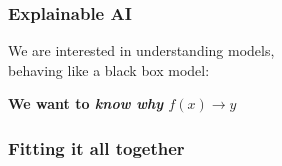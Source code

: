 \begin{frame}[t]
    \frametitle{Explainable AI}
    We are interested in understanding models,\\
    behaving like a black box model:\\\vspace{20pt}
    \pause
    \vspace{20pt}
    \begin{center}
        \textbf{We want to \emph{know why} $f(x)\rightarrow y$}
    \end{center}
    
\end{frame}
\begin{frame}[t]
    \frametitle{Fitting it all together}
    \begin{center}
        
    \end{center}
\end{frame}